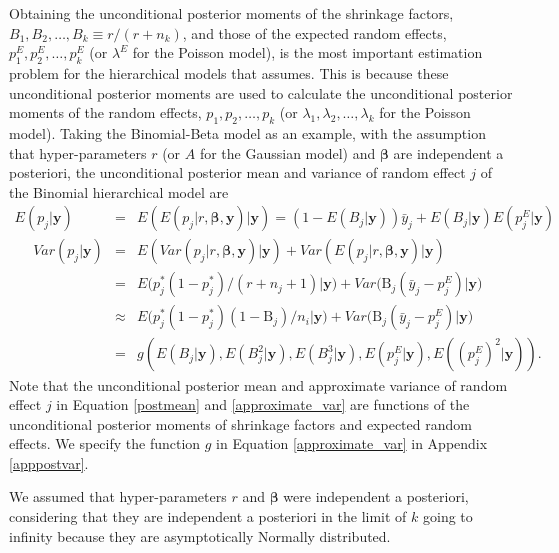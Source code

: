 \documentclass[article]{jss}
\begin{document}
Obtaining the unconditional posterior moments of the shrinkage factors, $B_1, B_2, \ldots, B_k\equiv r/(r+n_k)$, and those of the expected random effects, $p^E_1, p^E_2, \ldots, p^E_k$ (or $\lambda^E$ for the Poisson model), is the most important estimation problem for the hierarchical models that  assumes. This is because these unconditional posterior moments are used to calculate the unconditional posterior moments of the random effects, $p_1, p_2, \ldots, p_k$ (or $\lambda_1, \lambda_2, \ldots, \lambda_k$ for the Poisson model). Taking the Binomial-Beta model as an example, with the assumption that hyper-parameters $r$ (or $A$ for the Gaussian model) and $\boldsymbol{\beta}$ are independent a posteriori, the unconditional posterior mean and variance of random effect $j$ of the Binomial hierarchical model are
\begin{eqnarray}
E(p_{j}\vert \boldsymbol{y}) &=&E(E(p_{j}\vert r, \boldsymbol{\beta}, \boldsymbol{y})\vert\boldsymbol{y})=(1-E(B_j\vert\boldsymbol{y}))\bar{y}_j + E(B_j\vert  \boldsymbol{y})E(p^E_{j}\vert  \boldsymbol{y})\label{postmean} \\
~~~~~~Var(p_{j}\vert \boldsymbol{y}) &=&  E(Var(p_{j}\vert r, \boldsymbol{\beta}, \boldsymbol{y})\vert \boldsymbol{y})+Var(E(p_{j}\vert r, \boldsymbol{\beta},\boldsymbol{y})\vert \boldsymbol{y})\label{postvar}\\
&=& E\big(p^{\ast}_{j}(1-p^{\ast}_{j})/ (r+n_{j}+1)\vert  \boldsymbol{y}\big)+Var\big(\textrm{B}_{j}(\bar{y}_{j}-p^E_{j})\vert \boldsymbol{y}\big) \\
&\approx&E\big(p^{\ast}_{j}(1-p^{\ast}_{j})(1-\textrm{B}_{j})/n_{i}\vert \boldsymbol{y}\big)+Var\big(\textrm{B}_{j}(\bar{y}_{j}-p^E_{j})\vert \boldsymbol{y}\big)\\
&=&g(E(B_j\vert\boldsymbol{y}), E(B^2_j\vert\boldsymbol{y}), E(B^3_j\vert\boldsymbol{y}),  E(p^E_{j}\vert\boldsymbol{y}), E((p^E_{j})^2\vert\boldsymbol{y})).\label{approximate_var}
\end{eqnarray}
Note that the unconditional posterior mean and approximate variance of random effect $j$ in Equation \ref{postmean}  and \ref{approximate_var}  are functions of the unconditional posterior moments of shrinkage factors and expected random effects. We specify the function $g$ in Equation \ref{approximate_var} in Appendix \ref{apppostvar}.  

We assumed that hyper-parameters $r$ and  $\boldsymbol{\beta}$ were independent a posteriori, considering that they are independent a posteriori in the limit of $k$ going to infinity  because they are asymptotically Normally distributed. 
\end{document}
